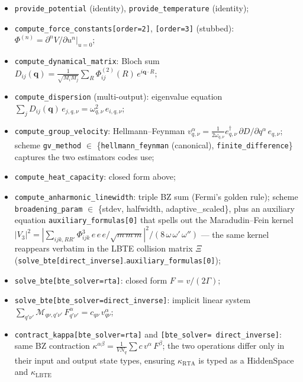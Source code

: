 \documentclass[11pt,a4paper]{article}
\begin{document}
\begin{itemize}[leftmargin=2em, itemsep=0.2em]
  \item \texttt{provide\_potential} (identity), \texttt{provide\_temperature} (identity);
  \item \texttt{compute\_force\_constants[order=2]}, \texttt{[order=3]} (stubbed):
        $\Phi^{(n)} = \partial^n V / \partial u^n |_{u=0}$;
  \item \texttt{compute\_dynamical\_matrix}: Bloch sum
        $D_{ij}(\mathbf{q}) = \frac{1}{\sqrt{M_i M_j}}\sum_R \Phi^{(2)}_{ij}(R)\,
        e^{i\mathbf{q}\cdot R}$;
  \item \texttt{compute\_dispersion} (multi-output): eigenvalue equation
        $\sum_j D_{ij}(\mathbf{q})\, e_{j,q,\nu} = \omega^2_{q,\nu}\, e_{i,q,\nu}$;
  \item \texttt{compute\_group\_velocity}: Hellmann--Feynman
        $v^\alpha_{q,\nu} = \frac{1}{2\omega_{q,\nu}} e^\dagger_{q,\nu}\,
        \partial D / \partial q^\alpha\, e_{q,\nu}$; scheme
        \texttt{gv\_method} $\in$ \{\texttt{hellmann\_feynman} (canonical),
        \texttt{finite\_difference}\} captures the two estimators codes use;
  \item \texttt{compute\_heat\_capacity}: closed form above;
  \item \texttt{compute\_anharmonic\_linewidth}: triple BZ sum (Fermi's golden rule);
        scheme \texttt{broadening\_param} $\in$ \{stdev,
        halfwidth, adaptive\_scaled\}, plus an auxiliary equation
        \texttt{auxiliary\_formulas[0]} that spells out the Maradudin--Fein
        kernel $|V_3|^2 = |\sum_{ijk,RR'} \Phi^3_{ijk}\, e\, e\, e /
        \sqrt{m\,m\,m}|^2 / (8\, \omega\, \omega'\, \omega'')$ ---
        the same kernel reappears verbatim in the LBTE collision matrix
        $\Xi$ (\texttt{solve\_bte[direct\_inverse]}.\texttt{auxiliary\_formulas[0]});
  \item \texttt{solve\_bte[bte\_solver=rta]}: closed form $F = v/(2\Gamma)$;
  \item \texttt{solve\_bte[bte\_solver=direct\_inverse]}: implicit linear system
        $\sum_{q'\nu'} \mathcal{M}_{q\nu,q'\nu'}\, F^\alpha_{q'\nu'} = c_{q\nu}\,
        v^\alpha_{q\nu}$;
  \item \texttt{contract\_kappa[bte\_solver=rta]} and \texttt{[bte\_solver=
        direct\_inverse]}: same BZ contraction
        $\kappa^{\alpha\beta} = \frac{1}{V N_q}\sum c\, v^\alpha\, F^\beta$;
        the two operations differ only in their input and output state types,
        ensuring $\kappa_\text{RTA}$ is typed as a HiddenSpace and $\kappa_\text{LBTE}$

\end{itemize}
\end{document}
